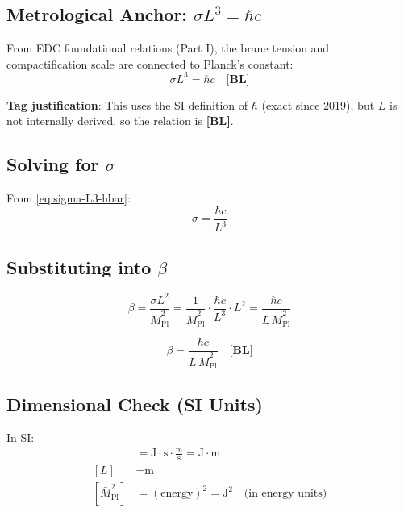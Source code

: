 \documentclass[11pt,a4paper]{article}
\newcommand{\Mpl}{\bar{M}_{\mathrm{Pl}}}
\newcommand{\tagBL}{\textbf{[BL]}}
\theoremstyle{definition}
\theoremstyle{plain}
\theoremstyle{remark}
\begin{document}
\subsection{Metrological Anchor: $\sigma L^3 = \hbar c$}
\label{sec:metrological-anchor}

From EDC foundational relations (Part I), the brane tension and compactification scale
are connected to Planck's constant:
\begin{equation}
\sigma L^3 = \hbar c \quad \tagBL{}
\label{eq:sigma-L3-hbar}
\end{equation}

\textbf{Tag justification}: This uses the SI definition of $\hbar$ (exact since 2019),
but $L$ is not internally derived, so the relation is \tagBL{}.

\subsection{Solving for $\sigma$}

From \cref{eq:sigma-L3-hbar}:
\begin{equation}
\sigma = \frac{\hbar c}{L^3}
\label{eq:sigma-from-anchor}
\end{equation}

\subsection{Substituting into $\beta$}

\begin{equation}
\beta = \frac{\sigma L^2}{\Mpl^2} = \frac{1}{\Mpl^2} \cdot \frac{\hbar c}{L^3} \cdot L^2
= \frac{\hbar c}{L \, \Mpl^2}
\label{eq:beta-route-a-step1}
\end{equation}

\begin{equation}
\boxed{\beta = \frac{\hbar c}{L \, \Mpl^2} \quad \tagBL{}}
\label{eq:beta-route-a-final}
\end{equation}

\subsection{Dimensional Check (SI Units)}

In SI:
\begin{align}
[\hbar c] &= \text{J} \cdot \text{s} \cdot \frac{\text{m}}{\text{s}} = \text{J} \cdot \text{m} \label{eq:hbar-c-SI} \\
[L] &= \text{m} \label{eq:L-SI} \\
[\Mpl^2] &= (\text{energy})^2 = \text{J}^2 \quad \text{(in energy units)} \label{eq:Mpl2-SI}
\end{align}
\end{document}
